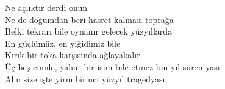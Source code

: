 \noindent\newline
Ne açlıktır derdi onun \\
Ne de doğumdan beri hasret kalması toprağa \\
Belki tekrarı bile oynanır gelecek yüzyıllarda \\
En güçlümüz, en yiğidimiz bile \\
Kırık bir toka karşısında ağlayakalır \\
Üç beş cümle, yahut bir isim bile etmez bin yıl süren yası \\
Alın size işte yirmibirinci yüzyıl tragedyası. \\